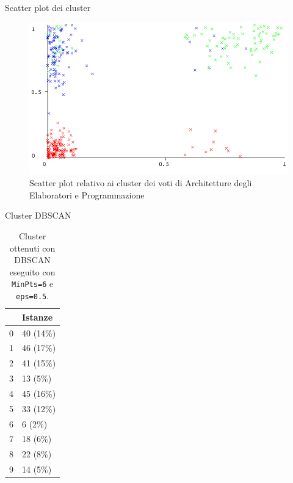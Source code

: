 \documentclass{beamer}
\begin{document}
\begin{frame}{Scatter plot dei cluster}
  \begin{figure}[bt]
    \includegraphics[width=\textwidth]{../img/ARC-PRG-Cluster.png}
    \caption{Scatter plot relativo ai cluster dei voti di Architetture degli Elaboratori e Programmazione}
  \end{figure}
\end{frame}

\begin{frame}{Cluster DBSCAN}
  \begin{table}[H]
    \centering
    \begin{tabular}{@{}ll@{}}
    \toprule
                            & Istanze  \\\midrule
    \multicolumn{1}{l}{0} & 40 (14\%)  \\
    \multicolumn{1}{l}{1} & 46 (17\%)  \\
    \multicolumn{1}{l}{2} & 41 (15\%)  \\
    \multicolumn{1}{l}{3} & 13 (5\%)   \\
    \multicolumn{1}{l}{4} & 45 (16\%)  \\
    \multicolumn{1}{l}{5} & 33 (12\%)  \\
    \multicolumn{1}{l}{6} & 6  (2\%)   \\
    \multicolumn{1}{l}{7} & 18 (6\%)   \\
    \multicolumn{1}{l}{8} & 22 (8\%)   \\
    \multicolumn{1}{l}{9} & 14 (5\%)   \\\bottomrule
    \end{tabular}
    \caption{Cluster ottenuti con DBSCAN eseguito con \texttt{MinPts=6} e \texttt{eps=0.5}.}
    \end{table}
\end{frame}
\end{document}
